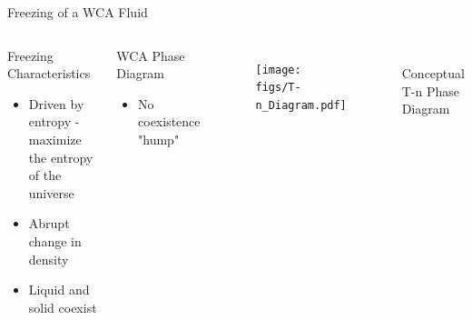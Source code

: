 \documentclass{beamer}
\begin{document}
\begin{frame}{Freezing of a WCA Fluid}
	\begin{columns}[t]
		\begin{block}{Freezing Characteristics}
		     \begin{itemize}
				\item Driven by entropy - maximize the entropy of the universe				
				\item Abrupt change in density
				\item Liquid and solid coexist
			 \end{itemize}		
		\end{block} 
		\begin{block}{WCA Phase Diagram}
		     \begin{itemize}
				\item No coexistence "hump"				
			  \end{itemize}				 
		\end{block}			       
	    \vspace{-2em}
		 \begin{figure}
            \centering
            \texttt{[image: figs/T-n\_Diagram.pdf]}
          \end{figure}
          \vspace{-1em}
         $~~$Conceptual T-n Phase Diagram          
	\end{columns}
    \vspace{+1em}
\end{frame}
\end{document}
